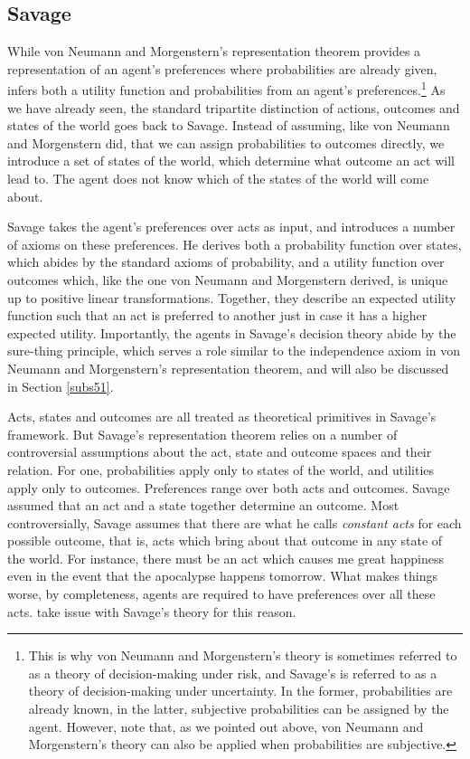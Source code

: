 \subsection{Savage}\label{subs23}

While von Neumann and Morgenstern's representation theorem provides a representation of an agent's preferences where probabilities are already given, \citet{Savage1954} infers both a utility function and probabilities from an agent's preferences.\footnote{This is why von Neumann and Morgenstern's theory is sometimes referred to as a theory of decision-making under risk, and Savage's is referred to as a theory of decision-making under uncertainty. In the former, probabilities are already known, in the latter, subjective probabilities can be assigned by the agent. However, note that, as we pointed out above, von Neumann and Morgenstern's theory can also be applied when probabilities are subjective.} As we have already seen, the standard tripartite distinction of actions, outcomes and states of the world goes back to Savage. Instead of assuming, like von Neumann and Morgenstern did, that we can assign probabilities to outcomes directly, we introduce a set of states of the world, which determine what outcome an act will lead to. The agent does not know which of the states of the world will come about.

Savage takes the agent's preferences over acts as input, and introduces a number of axioms on these preferences. He derives both a probability function over states, which abides by the standard axioms of probability, and a utility function over outcomes which, like the one von Neumann and Morgenstern derived, is unique up to positive linear transformations. Together, they describe an expected utility function such that an act is preferred to another just in case it has a higher expected utility. Importantly, the agents in Savage's decision theory abide by the sure-thing principle, which serves a role similar to the independence axiom in von Neumann and Morgenstern's representation theorem, and will also be discussed in Section \ref{subs51}.

Acts, states and outcomes are all treated as theoretical primitives in Savage's framework. But Savage's representation theorem relies on a number of controversial assumptions about the act, state and outcome spaces and their relation. For one, probabilities apply only to states of the world, and utilities apply only to outcomes. Preferences range over both acts and outcomes. Savage assumed that an act and a state together determine an outcome. Most controversially, Savage assumes that there are what he calls {\em constant acts} for each possible outcome, that is, acts which bring about that outcome in any state of the world. For instance,  there must be an act which causes me great happiness even in the event that the apocalypse happens tomorrow. What makes things worse, by completeness, agents are required to have preferences over all these acts. \citet{LuceSuppes1965} take issue with Savage's theory for this reason.

